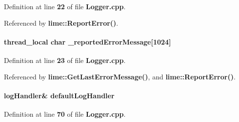Definition at line {\bf 22} of file {\bf Logger.\+cpp}.



Referenced by {\bf lime\+::\+Report\+Error()}.

\paragraph[{\+\_\+reported\+Error\+Message}]{\setlength{\rightskip}{0pt plus 5cm}thread\+\_\+local char \+\_\+reported\+Error\+Message[1024]}\label{Logger_8cpp_afa8ace06f8ece4a3d334d9cd2dbbdd14}


Definition at line {\bf 23} of file {\bf Logger.\+cpp}.



Referenced by {\bf lime\+::\+Get\+Last\+Error\+Message()}, and {\bf lime\+::\+Report\+Error()}.

\paragraph[{default\+Log\+Handler}]{ log\+Handler\& default\+Log\+Handler\hspace{0.3cm}{\ttfamily [static]}}\label{Logger_8cpp_af010d84d59c16d229a91e2e1c18f66f1}


Definition at line {\bf 70} of file {\bf Logger.\+cpp}.

